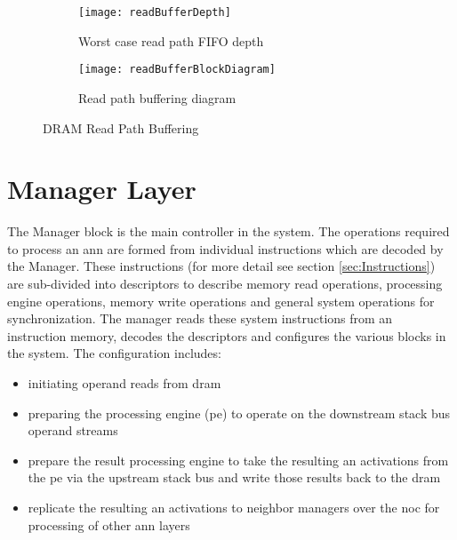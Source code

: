 \begin{figure}
\centering
\begin{subfigure}{.9\textwidth}
  \centering
  \texttt{[image: readBufferDepth]}
  \captionsetup{justification=centering, skip=0pt}
  \caption{Worst case read path FIFO depth}
  \label{fig:Worst case read path FIFO depth}
\end{subfigure}%

\bigskip

\vspace{-10pt}
\begin{subfigure}{.9\textwidth}
  \centering
  \texttt{[image: readBufferBlockDiagram]}
  \captionsetup{justification=centering, skip=6pt}
  \caption{Read path buffering diagram}
  \label{fig:Read path buffering diagram}
\end{subfigure}
\captionsetup{justification=centering, skip=16pt}
\caption{DRAM Read Path Buffering}
\label{fig:DRAM Read Path Buffering}
\end{figure}

\iffalse 
Each of the \ac{diram4} memories contain two channels with each channel containing 32 banks and each bank contains 4096 \SI[per-mode=symbol]{4}{\kilo\bit} pages.
\fi

\section{Manager Layer}
The Manager block is the main controller in the system. The operations required to process an \ac{ann} are formed from individual instructions which are decoded by the Manager. 
These instructions (for more detail see section \ref{sec:Instructions}) are sub-divided into descriptors to describe memory read operations, processing engine operations, memory write operations and general system operations for synchronization. 
The manager reads these system instructions from an instruction memory, decodes the descriptors and configures the various blocks in the system.
The configuration includes:
\begin{itemize}
      \item initiating operand reads from \ac{dram}
      \item preparing the processing engine (\ac{pe}) to operate on the downstream stack bus operand streams
      \item prepare the result processing engine to take the resulting \ac{an} activations from the \ac{pe} via the upstream stack bus and write those results back to the \ac{dram}
      \item replicate the resulting \ac{an} activations to neighbor managers over the \ac{noc} for processing of other \ac{ann} layers
\end{itemize}

